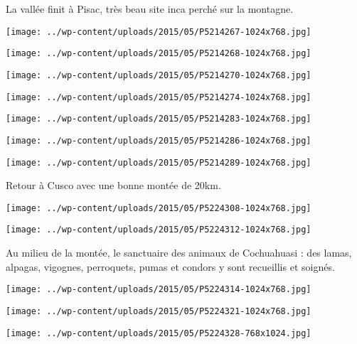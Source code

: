  La vallée finit à Pisac, très beau site inca perché sur la montagne. \newline
 \newline
\centerline{\texttt{[image: ../wp-content/uploads/2015/05/P5214267-1024x768.jpg]} } 
 \newline
 \newline
\centerline{\texttt{[image: ../wp-content/uploads/2015/05/P5214268-1024x768.jpg]} } 
 \newline
 \newline
\centerline{\texttt{[image: ../wp-content/uploads/2015/05/P5214270-1024x768.jpg]} } 
 \newline
 \newline
\centerline{\texttt{[image: ../wp-content/uploads/2015/05/P5214274-1024x768.jpg]} } 
 \newline
 \newline
\centerline{\texttt{[image: ../wp-content/uploads/2015/05/P5214283-1024x768.jpg]} } 
 \newline
 \newline
\centerline{\texttt{[image: ../wp-content/uploads/2015/05/P5214286-1024x768.jpg]} } 
 \newline
 \newline
\centerline{\texttt{[image: ../wp-content/uploads/2015/05/P5214289-1024x768.jpg]} } 
 \newline
 Retour à Cusco avec une bonne montée de 20km. \newline
 \newline
\centerline{\texttt{[image: ../wp-content/uploads/2015/05/P5224308-1024x768.jpg]} } 
 \newline
 \newline
\centerline{\texttt{[image: ../wp-content/uploads/2015/05/P5224312-1024x768.jpg]} } 
 \newline
 Au milieu de la montée, le sanctuaire des animaux de Cochuahuasi : des lamas, alpagas, vigognes, perroquets, pumas et condors y sont recueillis et soignés. \newline
 \newline
\centerline{\texttt{[image: ../wp-content/uploads/2015/05/P5224314-1024x768.jpg]} } 
 \newline
 \newline
\centerline{\texttt{[image: ../wp-content/uploads/2015/05/P5224321-1024x768.jpg]} } 
 \newline
 \newline
\centerline{\texttt{[image: ../wp-content/uploads/2015/05/P5224328-768x1024.jpg]} } 

\newpage
 
